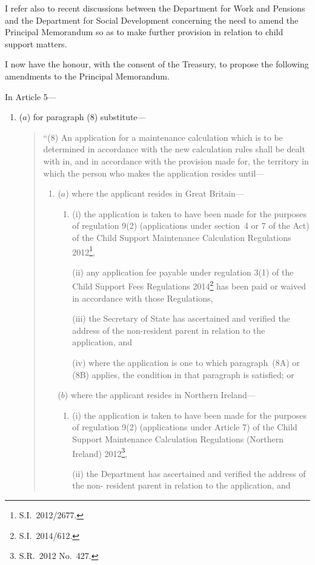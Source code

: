 \documentclass[12pt,a4paper]{article}
\begin{document}
I refer also to recent discussions between the Department for Work and Pensions and the
Department for Social Development concerning the need to amend the Principal
Memorandum so as to make further provision in relation to child support matters.

I now have the honour, with the consent of the Treasury, to propose the following amendments to the Principal Memorandum.

In Article 5---
\begin{enumerate}\item[]
($a$) for paragraph (8) substitute---
\begin{quotation}
``(8) An application for a maintenance calculation which is to be determined in
accordance with the new calculation rules shall be dealt with in, and in accordance
with the provision made for, the territory in which the person who makes the
application resides until---
\begin{enumerate}\item[]
($a$) where the applicant resides in Great Britain---
\begin{enumerate}\item[]
(i) the application is taken to have been made for the purposes of
regulation 9(2) (applications under section~4 or 7 of the Act) of the
Child Support Maintenance Calculation Regulations 2012\footnote{S.I.~2012/2677.},

(ii) any application fee payable under regulation 3(1) of the Child Support Fees Regulations 2014\footnote{S.I.~2014/612.} has been paid or waived in accordance with those Regulations,

(iii) the Secretary of State has ascertained and verified the address of the
non-resident parent in relation to the application, and

(iv) where the application is one to which paragraph~(8A) or (8B) applies,
the condition in that paragraph is satisfied; or
\end{enumerate}

($b$) where the applicant resides in Northern Ireland---
\begin{enumerate}\item[]
(i) the application is taken to have been made for the purposes of
regulation 9(2) (applications under Article 7) of the Child Support
Maintenance Calculation Regulations (Northern Ireland) 2012\footnote{S.R.~2012 No.~427.},

(ii) the Department has ascertained and verified the address of the non-%
resident parent in relation to the application, and


\end{enumerate}
\end{enumerate}
\end{quotation}
\end{enumerate}
\end{document}
